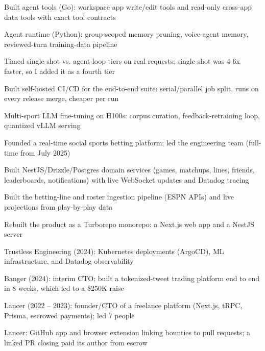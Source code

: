 \documentclass[print]{jack-resume}
\begin{document}
\begin{tightemize}
    \item Built agent tools (Go): workspace app write/edit tools and read-only cross-app data tools with exact tool contracts
    \item Agent runtime (Python): group-scoped memory pruning, voice-agent memory, reviewed-turn training-data pipeline
    \item Timed single-shot vs. agent-loop tiers on real requests; single-shot was 4-6x faster, so I added it as a fourth tier
    \item Built self-hosted CI/CD for the end-to-end suite: serial/parallel job split, runs on every release merge, cheaper per run
    \item Multi-sport LLM fine-tuning on H100s: corpus curation, feedback-retraining loop, quantized vLLM serving
\end{tightemize}
\sectionsep

\begin{tightemize}
    \item Founded a real-time social sports betting platform; led the engineering team (full-time from July 2025)
    \item Built NestJS/Drizzle/Postgres domain services (games, matchups, lines, friends, leaderboards, notifications) with live WebSocket updates and Datadog tracing
    \item Built the betting-line and roster ingestion pipeline (ESPN APIs) and live projections from play-by-play data
    \item Rebuilt the product as a Turborepo monorepo: a Next.js web app and a NestJS server
\end{tightemize}
\sectionsep

\begin{tightemize}
    \item Trustless Engineering (2024): Kubernetes deployments (ArgoCD), ML infrastructure, and Datadog observability
    \item Banger (2024): interim CTO; built a tokenized-tweet trading platform end to end in 8 weeks, which led to a \$250K raise
    \item Lancer (2022 -- 2023): founder/CTO of a freelance platform (Next.js, tRPC, Prisma, escrowed payments); led 7 people
    \item Lancer: GitHub app and browser extension linking bounties to pull requests; a linked PR closing paid its author from escrow
\end{tightemize}
\sectionsep
\end{document}
